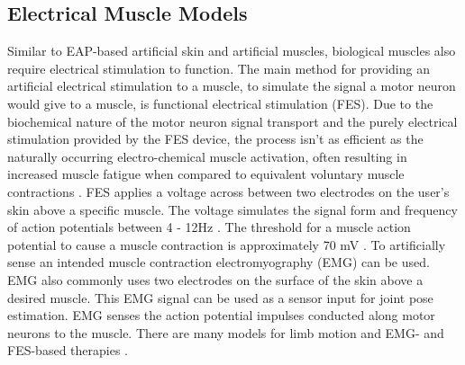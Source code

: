 

\subsection{Electrical Muscle Models}
Similar to EAP-based artificial skin and artificial muscles, biological muscles also require electrical stimulation to function. The main method for providing an artificial electrical stimulation to a muscle, to simulate the signal a motor neuron would give to a muscle, is functional electrical stimulation (FES). Due to the biochemical nature of the motor neuron signal transport and the purely electrical stimulation provided by the FES device, the process isn't as efficient as the naturally occurring electro-chemical muscle activation, often resulting in increased muscle fatigue when compared to equivalent voluntary muscle contractions \citep{Ibitoye2016}. FES applies a voltage across between two electrodes on the user's skin above a specific muscle. The voltage simulates the signal form and frequency of action potentials between 4 - 12Hz \citep{Popovic2004}. The threshold for a muscle action potential to cause a muscle contraction is approximately 70 mV \cite{Schmidt-Nielsen2002}.
To artificially sense an intended muscle contraction electromyography (EMG) can be used. EMG also commonly uses two electrodes on the surface of the skin above a desired muscle. This EMG signal can be used as a sensor input for joint pose estimation. EMG senses the action potential impulses conducted along motor neurons to the muscle. 
There are many models for limb motion and EMG- and FES-based therapies \cite{Meadmore2014,Freeman2015,Hodkin2018,Popovic2014}.




